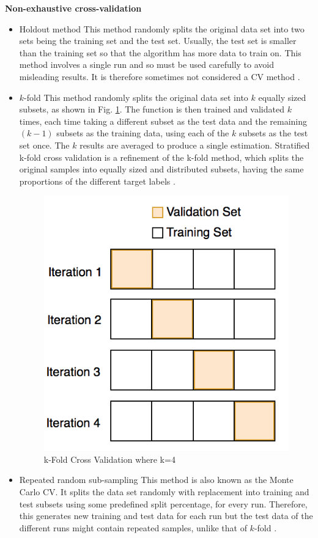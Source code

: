 \noindent\textbf{Non-exhaustive cross-validation}
\begin{itemize}
\item Holdout method \newline
This method randomly splits the original data set into two sets being the training set and the test set. Usually, the test set is smaller than the training set so that the algorithm has more data to train on. This method involves a single run and so must be used carefully to avoid misleading results. It is therefore sometimes not considered a CV method \cite{kohavi1995study}.

\item \(k\)-fold\newline
This method randomly splits the original data set into \(k\) equally sized subsets, as shown in Fig. \ref{fig:kfold}. The function is then trained and validated \(k\) times, each time taking a different subset as the test data and the remaining \((k-1)\) subsets as the training data, using each of the \(k\) subsets as the test set once. The \(k\) results are averaged to produce a single estimation. Stratified k-fold cross validation is a refinement of the k-fold method, which splits the original samples into equally sized and distributed subsets, having the same proportions of the different target labels \cite{kohavi1995study}.

\begin{figure}
\centering
  \includegraphics[width=0.5\linewidth]{kfold.png}
  \caption{k-Fold Cross Validation where k=4}
  \label{fig:kfold}
\end{figure}

\item Repeated random sub-sampling\newline
This method is also known as the Monte Carlo CV. It splits the data set randomly with replacement into training and test subsets using some predefined split percentage, for every run. Therefore, this generates new training and test data for each run but the test data of the different runs might contain repeated samples, unlike that of \(k\)-fold \cite{xu2001monte}.
\end{itemize}

